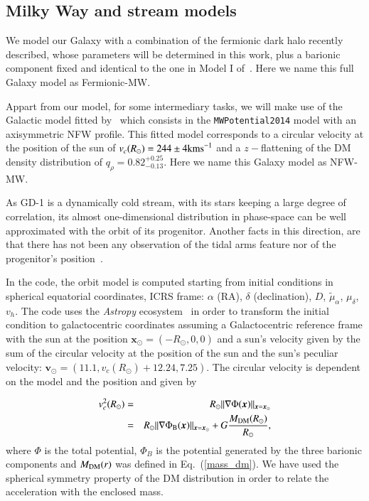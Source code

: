 \documentclass[twocolumn]{aa}
\begin{document}
\subsection{Milky Way and stream models}
\label{sec:MW_stream_models}

We model our Galaxy with a combination of the fermionic dark halo recently described, whose parameters will be determined in this work, plus a barionic component fixed and identical to the one in Model I of~\citet{2017A&A...598A..66P}. Here we name this full Galaxy model as Fermionic-MW.

Appart from our model, for some intermediary tasks, we will make use of the Galactic model fitted
by~\citet{2019MNRAS.486.2995M} which consists in the {\texttt{MWPotential2014}}
model with an axisymmetric NFW profile. This fitted model corresponds to a circular velocity at the position of the sun of
$v_c(R_\odot)=244 \pm 4 \rm{ km s}^{-1}$ and a $z-$flattening of the DM density distribution of $q_\rho=0.82^{+0.25}_{-0.13}$. Here we name this Galaxy model as NFW-MW.

As GD-1 is a dynamically cold stream, with its stars keeping a large degree of correlation, its almost
one-dimensional distribution in phase-space can be well approximated with the orbit of its progenitor.
Another facts in this direction, are that there has not been any observation of the tidal arms feature
nor of the progenitor's position~\citep{2019MNRAS.486.2995M,10.1093/mnras/sty677,10.1093/mnras/sty1338,Price-Whelan_2018}.

In the code, the orbit model is computed starting from initial conditions in spherical equatorial coordinates, ICRS frame: $\alpha$ (RA), $\delta$ (declination), $D$, $\tilde{\mu}_\alpha$, $\mu_\delta$, $v_h$.
The code uses the {\it Astropy} ecosystem~\citep{astropy:2022, astropy:2018, astropy:2013} in order to transform the initial condition to galactocentric coordinates assuming a Galactocentric reference frame with the sun at the position $\boldsymbol{x}_\odot=(-R_\odot,0,0)$ and a sun's velocity given by the sum of the circular velocity at the position of the sun and
the sun's peculiar velocity: $\boldsymbol{v}_\odot=(11.1, v_c(R_\odot)+12.24, 7.25)$. The circular velocity is dependent on the model and the position and given by

\begin{eqnarray}
   v_c^2(R_\odot)&=& R_\odot||\nabla \Phi(\boldsymbol{x})||_{\boldsymbol{x}=\boldsymbol{x}_\odot}\nonumber\\
   &=& R_\odot||\nabla \Phi_{\rm{B}}(\boldsymbol{x})||_{\boldsymbol{x}=\boldsymbol{x}_\odot}+
   G \frac{M_{\rm{DM}}(R_\odot)}{R_\odot},
\end{eqnarray}
where $\Phi$ is the total potential, $\Phi_B$ is the potential generated by the three barionic components and $M_{\rm{DM}}(r)$ was defined in Eq.~(\ref{mass_dm}). We have used the spherical symmetry property of the DM distribution in order to relate the acceleration with the enclosed mass.
\end{document}
